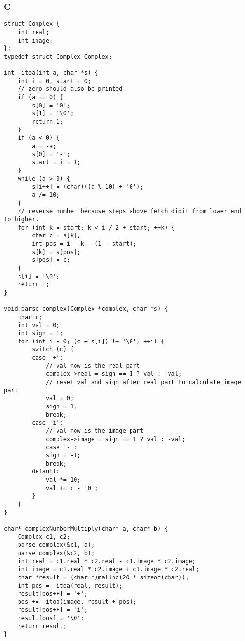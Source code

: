 \subsubsection*{C}
\begin{verbatim}
struct Complex {
    int real;
    int image;
};
typedef struct Complex Complex;

int _itoa(int a, char *s) {
    int i = 0, start = 0;
    // zero should also be printed
    if (a == 0) {
        s[0] = '0';
        s[1] = '\0';
        return 1;
    }
    if (a < 0) {
        a = -a;
        s[0] = '-';
        start = i = 1;
    }
    while (a > 0) {
        s[i++] = (char)((a % 10) + '0');
        a /= 10;
    }
    // reverse number because steps above fetch digit from lower end to higher.
    for (int k = start; k < i / 2 + start; ++k) {
        char c = s[k];
        int pos = i - k - (1 - start);
        s[k] = s[pos];
        s[pos] = c;
    }
    s[i] = '\0';
    return i;
}

void parse_complex(Complex *complex, char *s) {
    char c;
    int val = 0;
    int sign = 1;
    for (int i = 0; (c = s[i]) != '\0'; ++i) {
        switch (c) {
        case '+':
            // val now is the real part
            complex->real = sign == 1 ? val : -val;
            // reset val and sign after real part to calculate image part
            val = 0;
            sign = 1;
            break;
        case 'i':
            // val now is the image part
            complex->image = sign == 1 ? val : -val;
            case '-':
            sign = -1;
            break;
        default:
            val *= 10;
            val += c - '0';
        }
    }
}

char* complexNumberMultiply(char* a, char* b) {
    Complex c1, c2;
    parse_complex(&c1, a);
    parse_complex(&c2, b);
    int real = c1.real * c2.real - c1.image * c2.image;
    int image = c1.real * c2.image + c1.image * c2.real;
    char *result = (char *)malloc(20 * sizeof(char));
    int pos = _itoa(real, result);
    result[pos++] = '+';
    pos += _itoa(image, result + pos);
    result[pos++] = 'i';
    result[pos] = '\0';
    return result;
}
\end{verbatim}

\newpage

